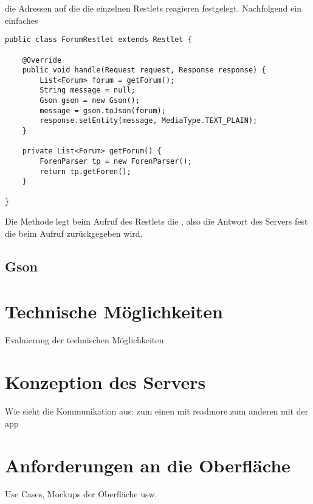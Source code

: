 die Adressen auf die die einzelnen Restlets reagieren festgelegt. Nachfolgend
ein einfaches 
\begin{lstlisting}[caption=Ein einfaches Restlet, label=restlet]
public class ForumRestlet extends Restlet {
	
	@Override
    public void handle(Request request, Response response) {
		List<Forum> forum = getForum();
        String message = null;
        Gson gson = new Gson();
        message = gson.toJson(forum);
        response.setEntity(message, MediaType.TEXT_PLAIN);
    }

	private List<Forum> getForum() {
		ForenParser tp = new ForenParser();
		return tp.getForen();
	}

}
\end{lstlisting}
Die Methode  legt beim Aufruf
des Restlets die , also die Antwort des Servers fest die
beim Aufruf zurückgegeben wird.
\subsection{Gson}

\section{Technische Möglichkeiten}
Evaluierung der technischen Möglichkeiten

\section{Konzeption des Servers}
Wie sieht die Kommunikation aus: zum einen mit readmore zum anderen mit der app

\section{Anforderungen an die Oberfläche}
Use Cases, Mockups der Oberfläche usw.